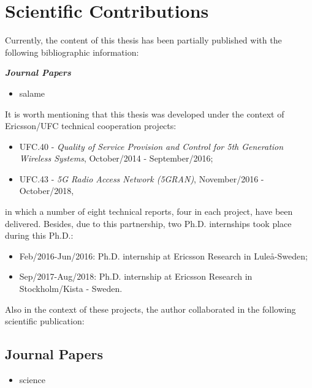 \section{Scientific Contributions}
\begin{refsection}

Currently, the content of this thesis has been partially published with the following bibliographic information: %

\noindent\textit{\textbf{Journal Papers}}
\begin{itemize}
	\item salame
\end{itemize}

It is worth mentioning that this thesis was developed under the context of Ericsson/UFC technical cooperation projects:
\begin{itemize}
	\item UFC.40 - \textit{Quality of Service Provision and Control for 5th Generation Wireless Systems}, October/2014 - September/2016;
	\item UFC.43 - \textit{5G Radio Access Network (5GRAN)}, November/2016 - October/2018,
\end{itemize}
in which a number of eight technical reports, four in each project, have been delivered. %
Besides, due to this partnership, two Ph.D. internships took place during this Ph.D.:
\begin{itemize}
	\item Feb/2016-Jun/2016: Ph.D. internship at Ericsson Research in Lule\aa -Sweden;
	\item Sep/2017-Aug/2018: Ph.D. internship at Ericsson Research in Stockholm/Kista - Sweden.
\end{itemize}

Also in the context of these projects, the author collaborated in the following scientific publication:

\subsection*{Journal Papers}
\begin{itemize}
    \item science
\end{itemize}

\end{refsection}
